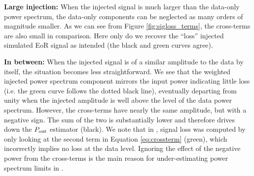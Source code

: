 \documentclass[preprint2,numberedappendix,tighten]{aastex6}  %
\begin{document}
{\bf Large injection:}
When the injected signal is much larger than the data-only power spectrum, the data-only components can 
be neglected as many orders of magnitude smaller. As we can see from Figure \ref{fig:sigloss_terms}, the cross-terms are also small in comparison. Here only do we recover the ``loss'' injected simulated EoR 
signal as intended (the black and green curves agree).

{\bf In between:}
When the injected signal is of a similar amplitude to the data by itself, the situation becomes less straightforward. We see that 
the weighted injected power spectrum component mirrors the input power indicating little loss (i.e. the green curve follows the dotted black line), eventually 
departing from unity when the injected amplitude is well above the level of the data power spectrum. However, 
the cross-terms have nearly the same amplitude, but with a negative sign. The sum of the two is substantially lower and therefore drives down the $P_{\rm out}$ estimator (black). We note that in , signal loss was computed by only looking at the second term in Equation \eqref{eq:crossterm} (green), which incorrectly implies no loss at the data level. Ignoring the effect of the negative power from the cross-terms is the main reason for under-estimating power spectrum limits in .

\end{document}
